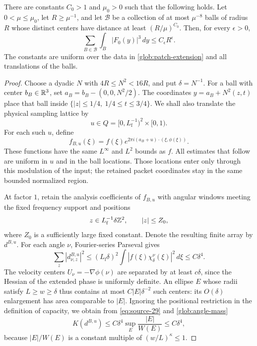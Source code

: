 \begin{lemma}\label{glob:sparse-cubic}
There are constants $C_0>1$ and $\mu_0>0$ such that the following holds.
Let $0<\mu\le\mu_0$, let $R\ge\mu^{-1}$, and let $\mathcal B$ be a
collection of at most $\mu^{-8}$ balls of radius $R$ whose distinct
centers have distance at least $(R/\mu)^{C_0}$. Then, for every
$\epsilon>0$,
\begin{equation}\label{eq:source-42}
             \sum_{B\in\mathcal B}\int_B |F_0(y)|^3\,dy
                    \le C_\epsilon R^\epsilon.
\end{equation}
The constants are uniform over the data in
\eqref{glob:patch-extension} and all translations of the balls.
\end{lemma}

\begin{proof}
Choose a dyadic $N$ with $4R\le N^2<16R$, and put $\delta=N^{-1}$.
For a ball with center $b_B\in\mathbb R^3$, set
$a_B=b_B-(0,0,N^2/2)$. The coordinates
$y=a_B+N^2(z,t)$ place that ball inside
$\{|z|\le 1/4,\ 1/4\le t\le3/4\}$.
We shall also translate the physical sampling lattice by
\[
 u\in Q=[0,L_{\mathrm f}^{-1})^2\times[0,1).
\]
For each such $u$, define
\[
 f_{B,u}(\xi)=f(\xi)
       e^{2\pi i(a_B+u)\cdot(\xi,\phi(\xi))}.
\]
These functions have the same $L^\infty$ and $L^2$ bounds as $f$.
All estimates that follow are uniform in \(u\) and in the ball
locations.  Those locations enter only through this modulation of the
input; the retained packet coordinates stay in the same bounded
normalized region.

At factor $1$, retain the analysis coefficients of $f_{B,u}$ with
angular windows meeting the fixed frequency support and positions
\[
 z\in L_{\mathrm f}^{-1}\delta\mathbb Z^2,\qquad |z|\le Z_0,
\]
where $Z_0$ is a sufficiently large fixed constant. Denote the resulting
finite array by $d^{B,u}$. For each angle $\nu$, Fourier-series
Parseval gives
\begin{equation}\label{glob:angle-mass}
 \sum_z|d_{\nu,z}^{B,u}|^2
 \le (L_{\mathrm f}\delta)^2
      \int |f(\xi)\chi_\delta^\nu(\xi)|^2\,d\xi
 \le C\delta^4.
\end{equation}
The velocity centers $U_\nu=-\nabla\phi(\nu)$ are separated by at
least $c\delta$, since the Hessian of the extended phase is uniformly
definite. An ellipse $E$ whose radii satisfy $L\ge w\ge\delta$ thus
contains at most $C|E|\delta^{-2}$ such centers: its $O(\delta)$
enlargement has area comparable to $|E|$. Ignoring the positional
restriction in the definition of capacity, we obtain from
\eqref{eq:source-29} and \eqref{glob:angle-mass}
\begin{equation}\label{glob:initial-capacity}
 K(d^{B,u})
 \le C\delta^4\sup_E\frac{|E|}{W(E)}
 \le C\delta^4,
\end{equation}
because $|E|/W(E)$ is a constant multiple of $(w/L)^\kappa\le1$.


\end{proof}
